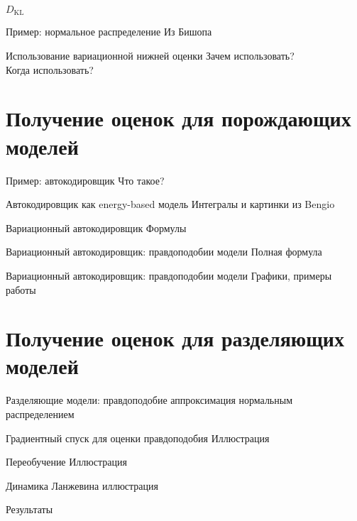 \documentclass[10pt,pdf,utf8,russian,aspectratio=169]{beamer}
\begin{document}
\begin{frame}{$D_\text{KL}$}

\end{frame}

\begin{frame}{Пример: нормальное распределение}
Из Бишопа
\end{frame}


\begin{frame}{Использование вариационной нижней оценки}
Зачем использовать? \\
Когда использовать?
\end{frame}

\section{Получение оценок для порождающих моделей}
\begin{frame}{Пример: автокодировщик}
Что такое?
\end{frame}

\begin{frame}{Автокодировщик как energy-based модель}
Интегралы и картинки из Bengio
\end{frame}

\begin{frame}{Вариационный автокодировщик}
Формулы
\end{frame}

\begin{frame}{Вариационный автокодировщик: правдоподобии модели}
Полная формула 
\end{frame}

\begin{frame}{Вариационный автокодировщик: правдоподобии модели}
Графики, примеры работы
\end{frame}

\section{Получение оценок для разделяющих моделей}
\begin{frame}{Разделяющие модели: правдоподобие}
аппроксимация нормальным распределением
\end{frame}

\begin{frame}{Градиентный спуск для оценки правдоподобия}
Иллюстрация
\end{frame}

\begin{frame}{Переобучение}
Иллюстрация
\end{frame}

\begin{frame}{Динамика Ланжевина}
иллюстрация
\end{frame}

\begin{frame}{Результаты}
\end{frame}
\end{document}
